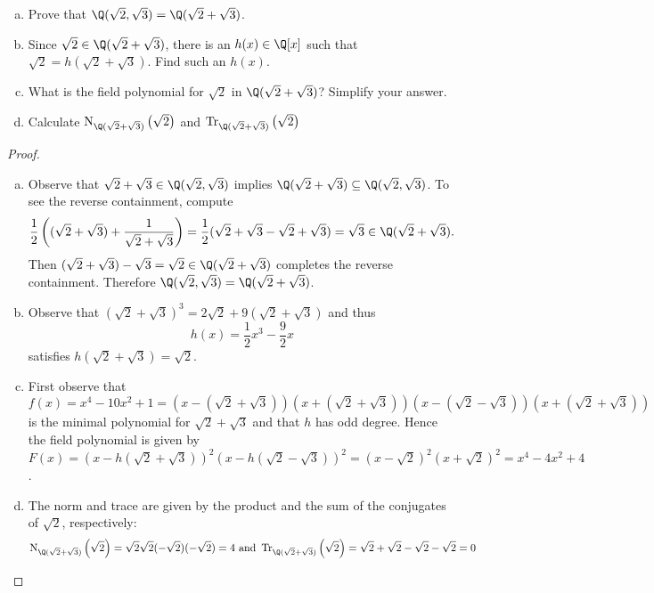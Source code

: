 \documentclass[10pt]{amsart}
\newcommand{\Tr}[2]{\operatorname{Tr}_{#1}\left(#2\right)}
\newcommand{\Norm}[2]{\operatorname{N}_{#1}\left(#2\right)}
\begin{document}
\begin{ex3}
  \begin{enumerate}[(a)]
    \item
      Prove that $\Q(\sqrt{2}, \sqrt{3}) = \Q(\sqrt{2} + \sqrt{3})$.
    \item
      Since $\sqrt{2} \in \Q(\sqrt{2} + \sqrt{3})$, there is an $h(x) \in \Q[x]$ such that $\sqrt{2} = h(\sqrt{2} + \sqrt{3})$.
      Find such an $h(x)$.
    \item
      What is the field polynomial for $\sqrt{2}$ in $\Q(\sqrt{2} + \sqrt{3})$?
      Simplify your answer.
    \item
      Calculate $\Norm{\Q(\sqrt{2} + \sqrt{3})}{\sqrt{2}}$ and $\Tr{\Q(\sqrt{2} + \sqrt{3})}{\sqrt{2}}$
  \end{enumerate}
  \begin{proof}
    \begin{enumerate}[(a)]
    \item
      Observe that $\sqrt{2} + \sqrt{3} \in \Q(\sqrt{2}, \sqrt{3})$ implies $\Q(\sqrt{2} + \sqrt{3}) \subseteq \Q(\sqrt{2}, \sqrt{3})$.
      To see the reverse containment, compute
      $$\frac{1}{2} \left( (\sqrt{2} + \sqrt{3}) + \frac{1}{\sqrt{2} + \sqrt{3}} \right) = \frac{1}{2}(\sqrt{2} + \sqrt{3} - \sqrt{2} + \sqrt{3}) = \sqrt{3} \in \Q(\sqrt{2} + \sqrt{3}).$$
      Then $(\sqrt{2} + \sqrt{3}) - \sqrt{3} = \sqrt{2} \in \Q(\sqrt{2} + \sqrt{3})$ completes the reverse containment.
      Therefore $\Q(\sqrt{2}, \sqrt{3}) = \Q(\sqrt{2} + \sqrt{3})$.
    \item
      Observe that $(\sqrt{2} + \sqrt{3})^3 = 2\sqrt{2} + 9(\sqrt{2} + \sqrt{3})$ and thus
      $$h(x) = \frac{1}{2}x^3 - \frac{9}{2}x$$
      satisfies $h(\sqrt{2} + \sqrt{3}) = \sqrt{2}$.
    \item
      First observe that $$f(x) = x^4 - 10x^2 + 1 = (x - (\sqrt{2} + \sqrt{3}))(x + (\sqrt{2} + \sqrt{3}))(x - (\sqrt{2} - \sqrt{3}))(x + (\sqrt{2} + \sqrt{3}))$$
      is the minimal polynomial for $\sqrt{2} + \sqrt{3}$ and that $h$ has odd degree.
      Hence the field polynomial is given by $F(x) = (x - h(\sqrt{2} + \sqrt{3}))^2(x - h(\sqrt{2} - \sqrt{3}))^2 = (x-\sqrt{2})^2(x + \sqrt{2})^2 = x^4 - 4x^2 + 4$.
    \item
      The norm and trace are given by the product and the sum of the conjugates of $\sqrt{2}$, respectively:
      $$\Norm{\Q(\sqrt{2} + \sqrt{3})}{\sqrt{2}} = \sqrt{2}\sqrt{2}(-\sqrt{2})(-\sqrt{2}) = 4 \text{ and } \Tr{\Q(\sqrt{2} + \sqrt{3})}{\sqrt{2}} = \sqrt{2} + \sqrt{2} - \sqrt{2} - \sqrt{2} = 0$$
    \end{enumerate}
  \end{proof}
\end{ex3}
\end{document}
